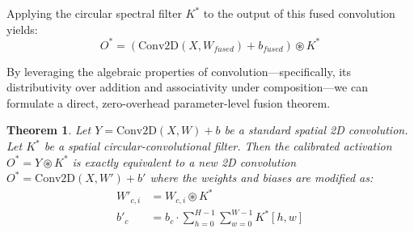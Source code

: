 \documentclass{article}
\theoremstyle{plain}
\newtheorem{theorem}{Theorem}[section]
\theoremstyle{definition}
\theoremstyle{remark}
\begin{document}
Applying the circular spectral filter $K^*$ to the output of this fused convolution yields:
\begin{equation}
    O^* = \left(\text{Conv2D}(X, W_{fused}) + b_{fused}\right) \circledast K^*
\end{equation}

By leveraging the algebraic properties of convolution—specifically, its distributivity over addition and associativity under composition—we can formulate a direct, zero-overhead parameter-level fusion theorem.

\begin{theorem}
Let $Y = \text{Conv2D}(X, W) + b$ be a standard spatial 2D convolution. Let $K^*$ be a spatial circular-convolutional filter. Then the calibrated activation $O^* = Y \circledast K^*$ is exactly equivalent to a new 2D convolution $O^* = \text{Conv2D}(X, W') + b'$ where the weights and biases are modified as:
\begin{align}
    W'_{c, i} &= W_{c, i} \circledast K^* \\
    b'_c &= b_c \cdot \sum_{h=0}^{H-1} \sum_{w=0}^{W-1} K^*[h, w]
\end{align}
\end{theorem}
\end{document}
